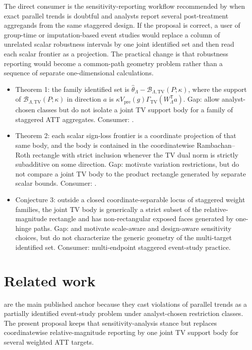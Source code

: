 \documentclass[11pt]{article}
\newcommand{\transpose}{\mathsf{T}}
\theoremstyle{definition}
\theoremstyle{plain}
\theoremstyle{remark}
\begin{document}
The direct consumer is the sensitivity-reporting workflow recommended by \citet{RothSantAnnaBilinskiPoe2023TrendingDiD} when exact parallel trends is doubtful and analysts report several post-treatment aggregands from the same staggered design. If the proposal is correct, a user of group-time or imputation-based event studies \citep{CallawaySantAnna2021MultiplePeriods,BorusyakJaravelSpiess2024EventStudies} would replace a column of unrelated scalar robustness intervals by one joint identified set and then read each scalar frontier as a projection. The practical change is that robustness reporting would become a common-path geometry problem rather than a sequence of separate one-dimensional calculations.

\begin{itemize}[leftmargin=*]
\item Theorem 1: the family identified set is \(\hat\theta_\Lambda-\mathcal B_{\Lambda,\mathrm{TV}}(P;\kappa)\), where the support of \(\mathcal B_{\Lambda,\mathrm{TV}}(P;\kappa)\) in direction \(a\) is \( \kappa V_{\mathrm{pre}}(g)\Gamma_{\mathrm{TV}}(W_\Lambda^\transpose a)\). Gap: \citet{RambachanRoth2023CrediblePT} allow analyst-chosen classes but do not isolate a joint TV support body for a family of staggered ATT aggregates. Consumer: \citet{RothSantAnnaBilinskiPoe2023TrendingDiD}.
\item Theorem 2: each scalar sign-loss frontier is a coordinate projection of that same body, and the body is contained in the coordinatewise Rambachan--Roth rectangle with strict inclusion whenever the TV dual norm is strictly subadditive on some direction. Gap: \citet{ManskiPepper2018BoundedVariation} motivate variation restrictions, but do not compare a joint TV body to the product rectangle generated by separate scalar bounds. Consumer: \citet{CallawaySantAnna2021MultiplePeriods}.
\item Conjecture 3: outside a closed coordinate-separable locus of staggered weight families, the joint TV body is generically a strict subset of the relative-magnitude rectangle and has non-rectangular exposed faces generated by one-hinge paths. Gap: \citet{KahnLangLang2020PromisePitfalls} and \citet{BorusyakJaravelSpiess2024EventStudies} motivate scale-aware and design-aware sensitivity choices, but do not characterize the generic geometry of the multi-target identified set. Consumer: multi-endpoint staggered event-study practice.
\end{itemize}

\section{Related work}
\citet{RambachanRoth2023CrediblePT} are the main published anchor because they cast violations of parallel trends as a partially identified event-study problem under analyst-chosen restriction classes. The present proposal keeps that sensitivity-analysis stance but replaces coordinatewise relative-magnitude reporting by one joint TV support body for several weighted ATT targets.
\end{document}
